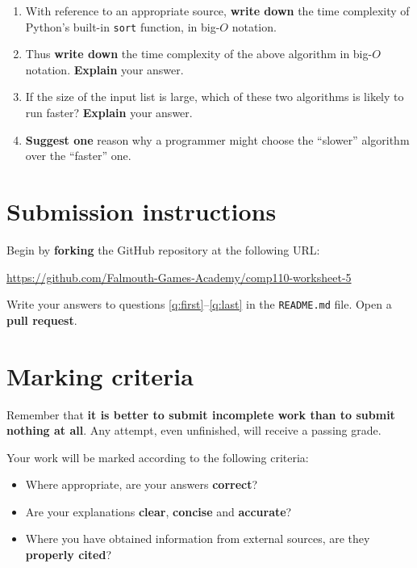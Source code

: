 \documentclass{../../../fal_assignment}
\begin{document}
\begin{enumerate}[resume,label=(\alph*)]
	\item With reference to an appropriate source, \textbf{write down} the time complexity of Python's built-in
		\lstinline{sort} function, in big-$O$ notation.
	\item Thus \textbf{write down} the time complexity of the above algorithm in big-$O$ notation.
		\textbf{Explain} your answer.
	\item If the size of the input list is large, which of these two algorithms is likely to run faster?
		\textbf{Explain} your answer.
	\item \textbf{Suggest one} reason why a programmer might choose the ``slower'' algorithm
		over the ``faster'' one.
	\label{q:last}
\end{enumerate}

\section*{Submission instructions}

Begin by \textbf{forking} the GitHub repository at the following URL:

\url{https://github.com/Falmouth-Games-Academy/comp110-worksheet-5}

Write your answers to questions \ref{q:first}--\ref{q:last} in the \texttt{README.md} file.
Open a \textbf{pull request}.

\section*{Marking criteria}

Remember that \textbf{it is better to submit incomplete work than to submit nothing at all}.
Any attempt, even unfinished, will receive a passing grade.

Your work will be marked according to the following criteria:
\begin{itemize}
	\item Where appropriate, are your answers \textbf{correct}?
	\item Are your explanations \textbf{clear}, \textbf{concise} and \textbf{accurate}?
	\item Where you have obtained information from external sources, are they \textbf{properly cited}?
\end{itemize}
\end{document}
